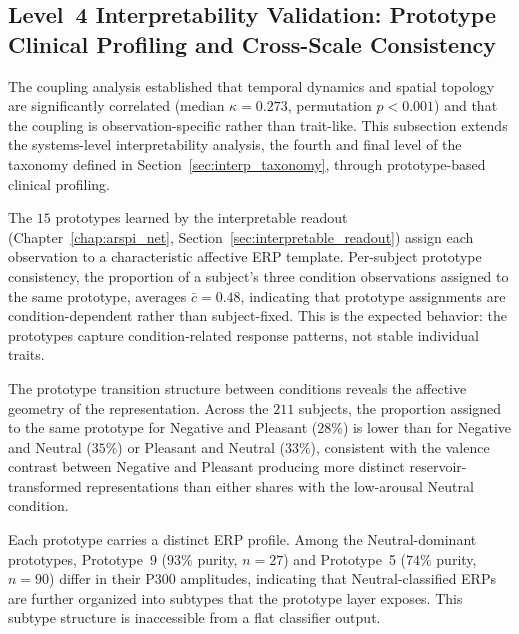 \subsection{Level~4 Interpretability Validation: Prototype Clinical Profiling and Cross-Scale Consistency}
\label{sec:ch7_level4}

The coupling analysis established that temporal dynamics and spatial topology are significantly correlated (median $\kappa = 0.273$, permutation $p < 0.001$) and that the coupling is observation-specific rather than trait-like. This subsection extends the systems-level interpretability analysis, the fourth and final level of the taxonomy defined in Section~\ref{sec:interp_taxonomy}, through prototype-based clinical profiling.

The $15$ prototypes learned by the interpretable readout (Chapter~\ref{chap:arspi_net}, Section~\ref{sec:interpretable_readout}) assign each observation to a characteristic affective ERP template. Per-subject prototype consistency, the proportion of a subject's three condition observations assigned to the same prototype, averages $\bar{c} = 0.48$, indicating that prototype assignments are condition-dependent rather than subject-fixed. This is the expected behavior: the prototypes capture condition-related response patterns, not stable individual traits.

The prototype transition structure between conditions reveals the affective geometry of the representation. Across the $211$ subjects, the proportion assigned to the same prototype for Negative and Pleasant ($28\%$) is lower than for Negative and Neutral ($35\%$) or Pleasant and Neutral ($33\%$), consistent with the valence contrast between Negative and Pleasant producing more distinct reservoir-transformed representations than either shares with the low-arousal Neutral condition.

Each prototype carries a distinct ERP profile. Among the Neutral-dominant prototypes, Prototype~9 ($93\%$ purity, $n = 27$) and Prototype~5 ($74\%$ purity, $n = 90$) differ in their P300 amplitudes, indicating that Neutral-classified ERPs are further organized into subtypes that the prototype layer exposes. This subtype structure is inaccessible from a flat classifier output.

